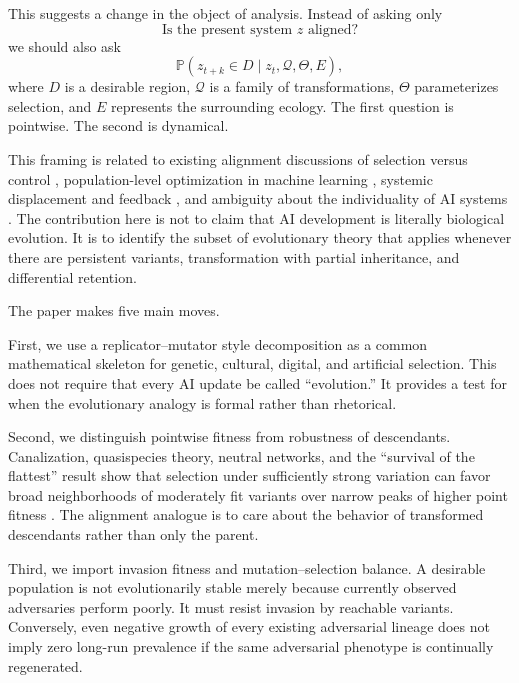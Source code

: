\documentclass[11pt]{article}
\newcommand{\Prb}{\mathbb{P}}
\newcommand{\Q}{\mathcal{Q}}
\newcommand{\ThetaS}{\Theta}
\begin{document}
This suggests a change in the object of analysis. Instead of asking only
\begin{equation}
    \text{Is the present system } z \text{ aligned?}
\end{equation}
we should also ask
\begin{equation}
    \Prb\!\left(z_{t+k}\in D \mid z_t,\Q,\ThetaS,E\right),
\end{equation}
where $D$ is a desirable region, $\Q$ is a family of transformations, $\ThetaS$ parameterizes selection, and $E$ represents the surrounding ecology. The first question is pointwise. The second is dynamical.

This framing is related to existing alignment discussions of selection versus control \parencite{demski2019}, population-level optimization in machine learning \parencite{jaderberg2017}, systemic displacement and feedback \parencite{kulveit2025gradual}, and ambiguity about the individuality of AI systems \parencite{kulveit2025pando}. The contribution here is not to claim that AI development is literally biological evolution. It is to identify the subset of evolutionary theory that applies whenever there are persistent variants, transformation with partial inheritance, and differential retention.

The paper makes five main moves.

First, we use a replicator--mutator style decomposition as a common mathematical skeleton for genetic, cultural, digital, and artificial selection. This does not require that every AI update be called ``evolution.'' It provides a test for when the evolutionary analogy is formal rather than rhetorical.

Second, we distinguish pointwise fitness from robustness of descendants. Canalization, quasispecies theory, neutral networks, and the ``survival of the flattest'' result show that selection under sufficiently strong variation can favor broad neighborhoods of moderately fit variants over narrow peaks of higher point fitness \parencite{flatt2005,wilke2001,hermisson2002}. The alignment analogue is to care about the behavior of transformed descendants rather than only the parent.

Third, we import invasion fitness and mutation--selection balance. A desirable population is not evolutionarily stable merely because currently observed adversaries perform poorly. It must resist invasion by reachable variants. Conversely, even negative growth of every existing adversarial lineage does not imply zero long-run prevalence if the same adversarial phenotype is continually regenerated.
\end{document}
